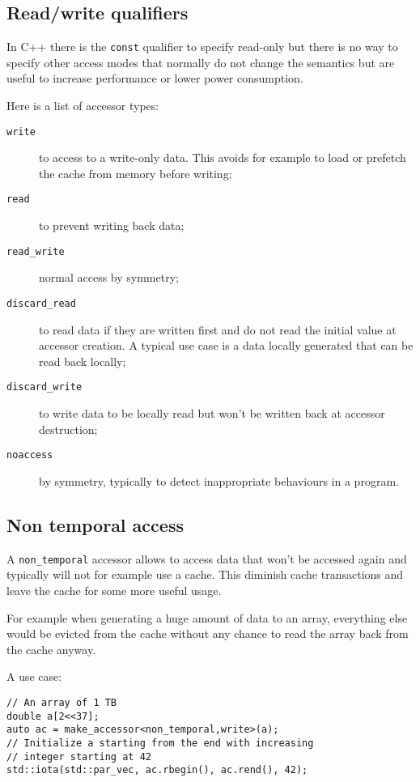 \documentclass[a4paper]{article}
\begin{document}
\subsection{Read/write qualifiers}
\label{sec:readwrite-qualifiers}

In C++ there is the \lstinline|const| qualifier to specify read-only
but there is no way to specify other access modes that normally do not
change the semantics but are useful to increase performance or lower
power consumption.

Here is a list of accessor types:
\begin{description}
\item[\texttt{write}] to access to a write-only data. This avoids for
  example to load or prefetch the cache from memory before writing;
\item[\texttt{read}] to prevent writing back data;
\item[\texttt{read\_write}] normal access by symmetry;
\item[\texttt{discard\_read}] to read data if they are written first
  and do not read the initial value at accessor creation. A typical
  use case is a data locally generated that can be read back locally;
\item[\texttt{discard\_write}] to write data to be locally read but
  won't be written back at accessor destruction;
\item[\texttt{noaccess}] by symmetry, typically to detect
  inappropriate behaviours in a program.
\end{description}


\subsection{Non temporal access}
\label{sec:non-temporal-access}

A \lstinline|non_temporal| accessor allows to access data that won't
be accessed again and typically will not for example use a cache. This
diminish cache transactions and leave the cache for some more useful
usage.

For example when generating a huge amount of data to an array, everything else
would be evicted from the cache without any chance to read the array
back from the cache anyway.

A use case:
\begin{lstlisting}
// An array of 1 TB
double a[2<<37];
auto ac = make_accessor<non_temporal,write>(a);
// Initialize a starting from the end with increasing
// integer starting at 42
std::iota(std::par_vec, ac.rbegin(), ac.rend(), 42);
\end{lstlisting}%
\end{document}
